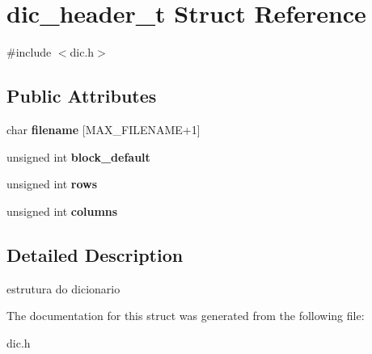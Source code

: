 \hypertarget{structdic__header__t}{}\section{dic\+\_\+header\+\_\+t Struct Reference}
\label{structdic__header__t}


{\ttfamily \#include $<$dic.\+h$>$}

\subsection*{Public Attributes}
\begin{DoxyCompactItemize}
\item 
\hypertarget{structdic__header__t_abf9ca7e9b386a5252380b5d12d6781a4}{}char {\bfseries filename} \mbox{[}M\+A\+X\+\_\+\+F\+I\+L\+E\+N\+A\+M\+E+1\mbox{]}\label{structdic__header__t_abf9ca7e9b386a5252380b5d12d6781a4}

\item 
\hypertarget{structdic__header__t_a5c00483f54ed1bb98b74fb25756b35cb}{}unsigned int {\bfseries block\+\_\+default}\label{structdic__header__t_a5c00483f54ed1bb98b74fb25756b35cb}

\item 
\hypertarget{structdic__header__t_af1b22c6fc2da3021483d34e9cc3118a5}{}unsigned int {\bfseries rows}\label{structdic__header__t_af1b22c6fc2da3021483d34e9cc3118a5}

\item 
\hypertarget{structdic__header__t_a180e0532442c0179e12102c7a11f8505}{}unsigned int {\bfseries columns}\label{structdic__header__t_a180e0532442c0179e12102c7a11f8505}

\end{DoxyCompactItemize}


\subsection{Detailed Description}
estrutura do dicionario 

The documentation for this struct was generated from the following file\+:\begin{DoxyCompactItemize}
\item 
dic.\+h\end{DoxyCompactItemize}
